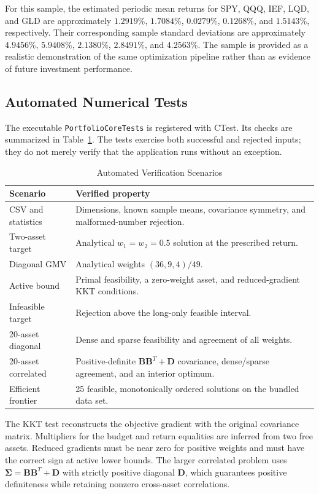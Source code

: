 \documentclass[conference]{IEEEtran}
\newcommand{\mat}[1]{\boldsymbol{#1}}
\begin{document}
For this sample, the estimated periodic mean returns for SPY, QQQ, IEF, LQD,
and GLD are approximately $1.2919\%$, $1.7084\%$, $0.0279\%$, $0.1268\%$, and
$1.5143\%$, respectively. Their corresponding sample standard deviations are
approximately $4.9456\%$, $5.9408\%$, $2.1380\%$, $2.8491\%$, and $4.2563\%$.
The sample is provided as a realistic demonstration of the same optimization
pipeline rather than as evidence of future investment performance.

\subsection{Automated Numerical Tests}

The executable \texttt{PortfolioCoreTests} is registered with CTest. Its
checks are summarized in Table~\ref{tab:tests}. The tests exercise both
successful and rejected inputs; they do not merely verify that the application
runs without an exception.

\begin{table}[!t]
\caption{Automated Verification Scenarios}
\label{tab:tests}
\centering
\scriptsize
\begin{tabular}{p{}p{}}
\toprule
Scenario & Verified property\\
\midrule
CSV and statistics & Dimensions, known sample means, covariance symmetry,
and malformed-number rejection.\\
Two-asset target & Analytical $w_1=w_2=0.5$ solution at the prescribed
return.\\
Diagonal GMV & Analytical weights $(36,9,4)/49$.\\
Active bound & Primal feasibility, a zero-weight asset, and reduced-gradient
KKT conditions.\\
Infeasible target & Rejection above the long-only feasible interval.\\
20-asset diagonal & Dense and sparse feasibility and agreement of all
weights.\\
20-asset correlated & Positive-definite $\mat{B}\mat{B}^{T}+\mat{D}$
covariance, dense/sparse agreement, and an interior optimum.\\
Efficient frontier & 25 feasible, monotonically ordered solutions on the
bundled data set.\\
\bottomrule
\end{tabular}
\end{table}

The KKT test reconstructs the objective gradient with the original covariance
matrix. Multipliers for the budget and return equalities are inferred from two
free assets. Reduced gradients must be near zero for positive weights and must
have the correct sign at active lower bounds. The larger correlated problem
uses $\mat{\Sigma}=\mat{B}\mat{B}^{T}+\mat{D}$ with strictly positive diagonal
$\mat{D}$, which guarantees positive definiteness while retaining nonzero
cross-asset correlations.
\end{document}
